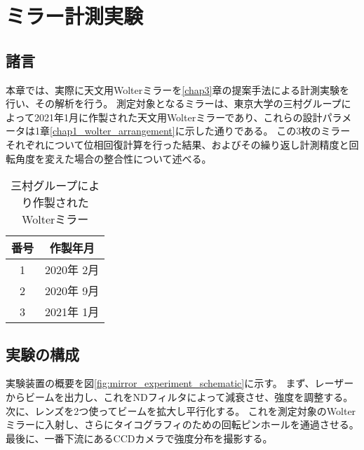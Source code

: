 \chapter{ミラー計測実験}
\thispagestyle{empty}
\label{chap5}
\graphicspath{{chap5/figure/}}
\minitoc

\newpage


\section{諸言}
\label{chap5_introduction}

本章では、実際に天文用Wolterミラーを\ref{chap3}章の提案手法による計測実験を行い、その解析を行う。
測定対象となるミラーは、東京大学の三村グループによって2021年1月に作製された天文用Wolterミラーであり、これらの設計パラメータは1章\ref{chap1_wolter_arrangement}に示した通りである。
この3枚のミラーそれぞれについて位相回復計算を行った結果、およびその繰り返し計測精度と回転角度を変えた場合の整合性について述べる。

\begin{table}[h]
\begin{center}
  \begin{tabular}{|c|c|} \hline
    番号 & 作製年月 \\ \hline
    1 & 2020年 2月 \\
    2 & 2020年 9月 \\
    3 & 2021年 1月 \\ \hline
  \end{tabular}
  \caption{三村グループにより作製されたWolterミラー}
  \label{tb:fabricated_wolter_mirror_list}
\end{center}
\end{table}

\clearpage
\newpage

\section{実験の構成}

実験装置の概要を図\ref{fig:mirror_experiment_schematic}に示す。
まず、レーザーからビームを出力し、これをNDフィルタによって減衰させ、強度を調整する。
次に、レンズを2つ使ってビームを拡大し平行化する。
これを測定対象のWolterミラーに入射し、さらにタイコグラフィのための回転ピンホールを通過させる。
最後に、一番下流にあるCCDカメラで強度分布を撮影する。

